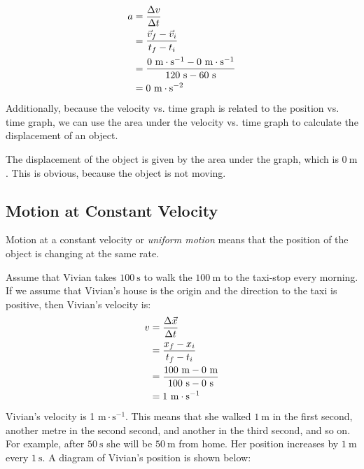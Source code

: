     \begin{align*}
    a &= \frac{\Delta v}{\Delta t}\hfill \\ 
    &= \frac{\vec{v}_{f}-\vec{v}_{i}}{{t}_{f}-{t}_{i}}\hfill \\ 
    &= \frac{0~\text{m}\cdot\text{s}^{-1}-0~\text{m}\cdot\text{s}^{-1}}{120~\text{s}-60~\text{s}}\\ 
    &= 0~\text{m}\cdot\text{s}^{-2}
      \end{align*}
        \label{m38795*id69809}Additionally, because the velocity vs. time graph is related to the position vs. time graph, we can use the area under the velocity vs. time graph to calculate the displacement of an object.\par 
\label{m38795*notfhsst!!!underscore!!!id2134}
	\par
        \label{m38795*id69821}The displacement of the object is given by the area under the graph, which is $0~\text{m}$. This is obvious, because the object is not moving.\par 
      \label{m38795*uid90}
            \subsection*{Motion at Constant Velocity}
            \nopagebreak
        \label{m38795*id69835}Motion at a constant velocity or \textsl{uniform motion} means that the position of the object is changing at the same rate.\par 
        \label{m38795*id69845}Assume that Vivian takes $100~\text{s}$ to walk the $100~\text{m}$ to the taxi-stop every morning. If we assume that Vivian's house is the origin and the direction to the taxi is positive, then Vivian's velocity is:
    \begin{align*}
    	v&= \frac{\Delta \vec{x}}{\Delta t}\hfill \\ 
	&= \frac{{x}_{f}-{x}_{i}}{{t}_{f}-{t}_{i}}\hfill \\ 
	&= \frac{100~\text{m}-0~\text{m}}{100~\text{s}-0~\text{s}}\\ 
	 &= 1~\text{m}\cdot{\text{s}}^{-1}
      \end{align*}
        \label{m38795*id70029}Vivian's velocity is 1 $\text{m}\cdot\text{s}^{-1}$. This means that she walked $1~\text{m}$ in the first second, another metre in the second second, and another in the third second, and so on. For example, after $50~\text{s}$ she will be $50~\text{m}$ from home. Her position increases by $1~\text{m}$ every $1~\text{s}$. A diagram of Vivian's position is shown below:


